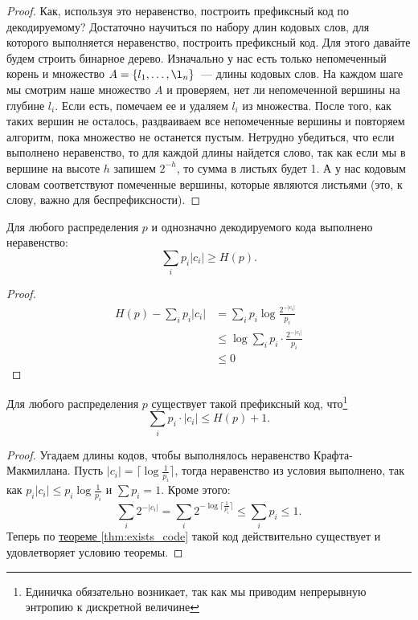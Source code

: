 \begin{proof}
	Как, используя это неравенство, построить префиксный код по декодируемому? Достаточно научиться по набору длин кодовых слов, для которого выполняется неравенство, построить префиксный код. Для этого давайте будем строить бинарное дерево. Изначально у нас есть только непомеченный корень и множество $A = \{l_1, \dots, \l_n\}$~--- длины кодовых слов. На каждом шаге мы смотрим наше множество $A$ и проверяем, нет ли непомеченной вершины на глубине $l_i$. Если есть, помечаем ее и удаляем $l_i$ из множества. После того, как таких вершин не осталось, раздваиваем все непомеченные вершины и повторяем алгоритм, пока множество не останется пустым. Нетрудно убедиться, что если выполнено неравенство, то для каждой длины найдется слово, так как если мы в вершине на высоте $h$ запишем $2^{-h}$, то сумма в листьях будет 1. А у нас кодовым словам соответствуют помеченные вершины, которые являются листьями (это, к слову, важно для беспрефиксности).
\end{proof}


\begin{thm}[Шеннон]
	Для любого распределения $ p$ и однозначно декодируемого кода выполнено неравенство:
   \[
	   \sum_{i} p_i \lvert c_i \rvert \ge  H(p) 
   .\] 
\end{thm}
\begin{proof}
	\begin{align*}
		H(p) - \sum_{i}^{} p_i \lvert c_i \rvert &= \sum_{i} p_i \log \frac{2^{-\lvert c_i \rvert }}{p_i} \\
												 & \le  \log \sum_i p_i \cdot \frac{2^{-\lvert c_i \rvert }}{p_i} \tag{Неравенство Йенсена}\\ 
												 & \le  0 \tag{Неравенство Крафта-Макмиллана}
	\end{align*}
\end{proof}


\begin{thm}[Шеннон]\label{thm:shannon}
	Для любого распределения $ p$ существует такой префиксный код, что\footnote{Единичка обязательно возникает, так как мы приводим непрерывную энтропию к дискретной величине}
	\[
		\sum_{i} p_i \cdot \lvert c_i \rvert \le H(p) + 1
	.\] 
\end{thm}
\begin{proof}
    Угадаем длины кодов, чтобы выполнялось неравенство Крафта-Макмиллана.
	Пусть $  \lvert c_i \rvert = \lceil \log \frac{1}{p_i} \rceil$, тогда неравенство из условия выполнено, так как $ p_i \lvert c_i \rvert \le p_i \log \frac{1}{p_i}$ и $ \sum p_i = 1$. Кроме этого:
	\[
		\sum_{i} 2^{- \lvert c_i \rvert } = \sum_{i} 2^{- \log \lceil \frac{1}{p_i} \rceil} \le \sum_{i} p_i \le 1
	.\] 
	Теперь по \hyperref[thm:exists_code]{теореме \ref{thm:exists_code}} такой код действительно существует и удовлетворяет условию теоремы.
\end{proof}

